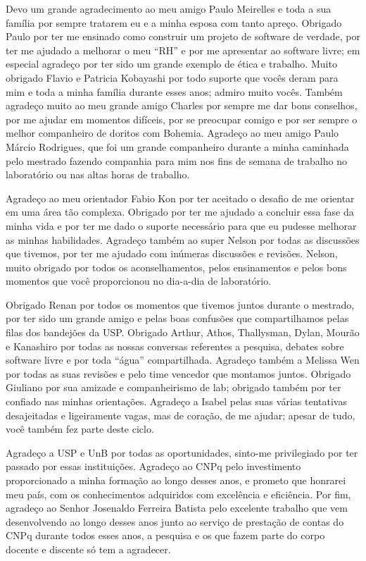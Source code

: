 Devo um grande agradecimento ao meu amigo Paulo Meirelles e toda a sua família
por sempre tratarem eu e a minha esposa com tanto apreço. Obrigado Paulo por
ter me ensinado como construir um projeto de software de verdade, por ter me
ajudado a melhorar o meu “RH” e por me apresentar ao software livre; em
especial agradeço por ter sido um grande exemplo de ética e trabalho. Muito
obrigado Flavio e Patricia Kobayashi por todo suporte que vocês deram para mim
e toda a minha família durante esses anos; admiro muito vocês. Também agradeço
muito ao meu grande amigo Charles por sempre me dar bons conselhos, por me
ajudar em momentos difíceis, por se preocupar comigo e por ser sempre o melhor
companheiro de doritos com Bohemia. Agradeço ao meu amigo Paulo Márcio
Rodrigues, que foi um grande companheiro durante a minha caminhada pelo
mestrado fazendo companhia para mim nos fins de semana de trabalho no
laboratório ou nas altas horas de trabalho.

Agradeço ao meu orientador Fabio Kon por ter aceitado o desafio de me orientar
em uma área tão complexa. Obrigado por ter me ajudado a concluir essa fase da
minha vida e por ter me dado o suporte necessário para que eu pudesse melhorar
as minhas habilidades. Agradeço também ao super Nelson por todas as discussões
que tivemos, por ter me ajudado com inúmeras discussões e revisões. Nelson,
muito obrigado por todos os aconselhamentos, pelos ensinamentos e pelos bons
momentos que você proporcionou no dia-a-dia de laboratório.

Obrigado Renan por todos os momentos que tivemos juntos durante o mestrado, por
ter sido um grande amigo e pelas boas confusões que compartilhamos pelas filas
dos bandejões da USP. Obrigado Arthur, Athos, Thallysman, Dylan, Mourão e
Kanashiro por todas as nossas conversas referentes a pesquisa, debates sobre
software livre e por toda “água” compartilhada. Agradeço também a Melissa Wen
por todas as suas revisões e pelo time vencedor que montamos juntos. Obrigado
Giuliano por sua amizade e companheirismo de lab; obrigado também por ter
confiado nas minhas orientações. Agradeço a Isabel pelas suas várias tentativas
desajeitadas e ligeiramente vagas, mas de coração, de me ajudar; apesar de
tudo, você também fez parte deste ciclo.

Agradeço a USP e UnB por todas as oportunidades, sinto-me privilegiado por ter
passado por essas instituições. Agradeço ao CNPq pelo investimento
proporcionado a minha formação ao longo desses anos, e prometo  que honrarei
meu país, com os conhecimentos adquiridos com excelência e eficiência.  Por
fim, agradeço ao Senhor Josenaldo Ferreira Batista pelo excelente trabalho que
vem desenvolvendo ao longo desses anos junto ao serviço de prestação de contas
do CNPq durante todos esses anos,  a pesquisa e os que fazem parte do corpo
docente e discente só tem a agradecer.

